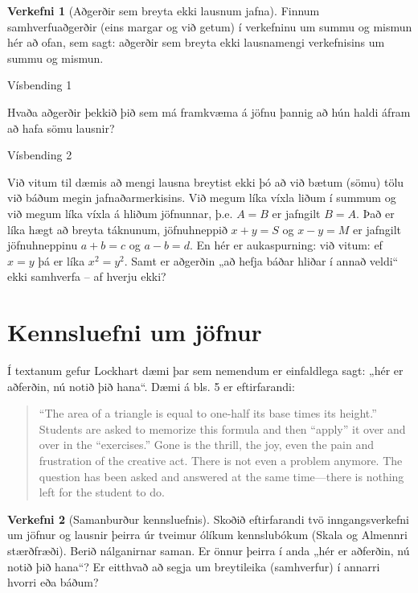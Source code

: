 \documentclass[
  icelandic,
]{book}
\theoremstyle{definition}
\theoremstyle{definition}
\theoremstyle{definition}
\newtheorem{exercise}{Verkefni}[chapter]
\theoremstyle{definition}
\theoremstyle{remark}
\begin{document}
\begin{exercise}[Aðgerðir sem breyta ekki lausnum jafna]
\protect\hypertarget{exr:exr-samhverfur-jafna}{}\label{exr:exr-samhverfur-jafna}Finnum samhverfuaðgerðir (eins margar og við getum) í verkefninu um summu og mismun hér að ofan, sem sagt: aðgerðir sem breyta ekki lausnamengi verkefnisins um summu og mismun.
\end{exercise}

Vísbending 1

Hvaða aðgerðir þekkið þið sem má framkvæma á jöfnu þannig að hún haldi áfram að hafa sömu lausnir?

Vísbending 2

Við vitum til dæmis að mengi lausna breytist ekki þó að við bætum (sömu) tölu við báðum megin jafnaðarmerkisins. Við megum líka víxla liðum í summum og við megum líka víxla á hliðum jöfnunnar, þ.e. \(A=B\) er jafngilt \(B=A\). Það er líka hægt að breyta táknunum, jöfnuhneppið \(x+y=S\) og \(x-y=M\) er jafngilt jöfnuhneppinu \(a+b=c\) og \(a-b=d\). En hér er aukaspurning: við vitum: ef \(x=y\) þá er líka \(x^2=y^2\). Samt er aðgerðin „að hefja báðar hliðar í annað veldi`` ekki samhverfa -- af hverju ekki?

\section{Kennsluefni um jöfnur}\label{kennsluefni-jofnur}

Í textanum gefur Lockhart dæmi þar sem nemendum er einfaldlega sagt: „hér er aðferðin, nú notið þið hana``. Dæmi á bls. 5 er eftirfarandi:

\begin{quote}
``The area of a triangle is equal to one-half its base times its height.'' Students are asked to memorize this formula and then ``apply'' it over and over in the ``exercises.'' Gone is the thrill, the joy, even the pain and frustration of the creative act. There is not even a problem anymore. The question has been asked and answered at the same time---there is nothing left for the student to do.
\end{quote}

\begin{exercise}[Samanburður kennsluefnis]
\protect\hypertarget{exr:exr-verkefni-kennsluefni-lockhart}{}\label{exr:exr-verkefni-kennsluefni-lockhart}Skoðið eftirfarandi tvö inngangsverkefni um jöfnur og lausnir þeirra úr tveimur ólíkum kennslubókum (Skala og Almennri stærðfræði). Berið nálganirnar saman. Er önnur þeirra í anda „hér er aðferðin, nú notið þið hana``? Er eitthvað að segja um breytileika (samhverfur) í annarri hvorri eða báðum?
\end{exercise}
\end{document}
